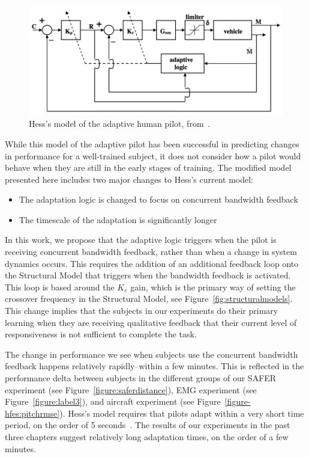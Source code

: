 \begin{figure}[tb]
    \begin{center}
        \includegraphics[width=0.8\linewidth]{figures/Modeling/Screen_Shot_2018-08-09_at_4_15_24_PM.png}
        \caption[Hess's model of the adaptive human pilot]{Hess's model of the adaptive human pilot, from~\citet{hess_modeling_2009}.}
        \label{figure:hesspursuit}
    \end{center}
\end{figure}

While this model of the adaptive pilot has been successful in predicting changes in performance for a well-trained subject, it does not consider how a pilot would behave when they are still in the early stages of training.
The modified model presented here includes two major changes to Hess's current model:
\begin{itemize}
    \item The adaptation logic is changed to focus on concurrent bandwidth feedback
    \item The timescale of the adaptation is significantly longer
\end{itemize}

In this work, we propose that the adaptive logic triggers when the pilot is receiving concurrent bandwidth feedback, rather than when a change in system dynamics occurs.
This requires the addition of an additional feedback loop onto the Structural Model that triggers when the bandwidth feedback is activated.
This loop is based around the $K_e$ gain, which is the primary way of setting the crossover frequency in the Structural Model, see Figure~\ref{fig:structuralmodels}.
This change implies that the subjects in our experiments do their primary learning when they are receiving qualitative feedback that their current level of responsiveness is not sufficient to complete the task.

The change in performance we see when subjects use the concurrent bandwidth feedback happens relatively rapidly--within a few minutes.
This is reflected in the performance delta between subjects in the different groups of our SAFER experiment (see Figure~\ref{figure:saferdistance}), EMG experiment (see Figure~\ref{figure:label3}), and aircraft experiment (see Figure~\ref{figure-hfes:pitchrmse}).
Hess's model requires that pilots adapt within a very short time period, on the order of 5 seconds~\citep{weir_model_1966}.
The results of our experiments in the past three chapters suggest relatively long adaptation times, on the order of a few minutes.

